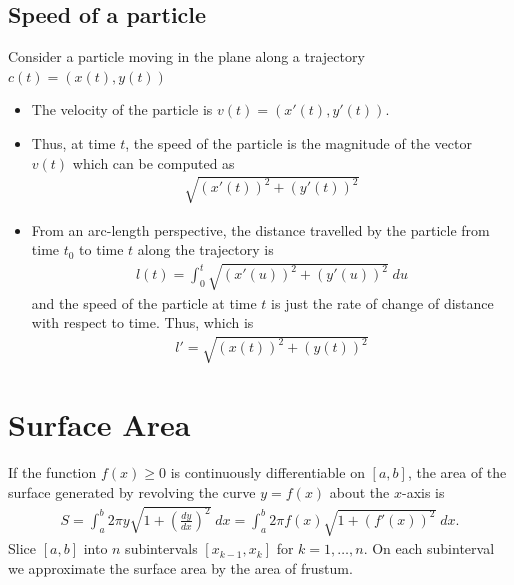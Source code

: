 \documentclass{report}
\begin{document}
	\section{Speed of a particle}

		Consider a particle moving in the plane along a trajectory $c(t) = (x(t), y(t))$
		\begin{itemize}
			\item The velocity of the particle is $v(t) = (x'(t), y'(t))$.
			\item Thus, at time $t$, the speed of the particle is the magnitude of the vector $v(t)$ which can be computed as
				\begin{align*}
					\sqrt{(x'(t))^2 + (y'(t))^2}
				\end{align*}
			\item From an arc-length perspective, the distance travelled by the particle from time $t_0$ to time $t$ along the trajectory is
				\begin{align*}
					l(t) = \int_0^t \sqrt{(x'(u))^2 + (y'(u))^2} \; du
				\end{align*}
				and the speed of the particle at time $t$ is just the rate of change of distance with respect to time. Thus, which is
				\begin{align*}
					l' = \sqrt{(x(t))^2 + (y(t))^2}
				\end{align*}
		\end{itemize}
	
\chapter{Surface Area}

	If the function $f(x) \geq 0$ is continuously differentiable on $[a,b]$, the area of the surface generated by revolving the curve $y = f(x)$ about the $x$-axis is
	\begin{align*}
		S = \int_a^b 2 \pi y \sqrt{1 + \left(\frac{dy}{dx}\right)^2} \; dx = \int_a^b 2\pi f(x) \sqrt{1 + (f'(x))^2} \; dx.
	\end{align*}
	Slice $[a,b]$ into $n$ subintervals $[x_{k-1}, x_k]$ for $k = 1,\dots,n$. On each subinterval we approximate the surface area by the area of frustum.
\end{document}
